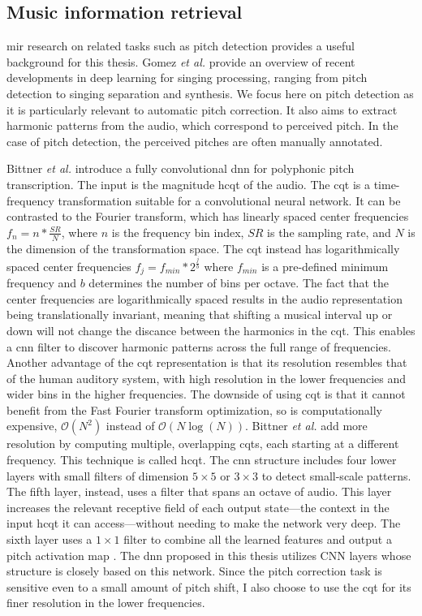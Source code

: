 \subsection{Music information retrieval}
\gls{mir} research on related tasks such as pitch detection provides a useful background for this thesis. Gomez {\it et al.}\cite{gomez2018deep} provide an overview of recent developments in deep learning for singing processing, ranging from pitch detection to singing separation and synthesis. We focus here on pitch detection as it is particularly relevant to automatic pitch correction. It also aims to extract harmonic patterns from the audio, which correspond to perceived pitch. In the case of pitch detection, the perceived pitches are often manually annotated. 

Bittner \textit{et al.} introduce a fully convolutional \gls{dnn} for polyphonic pitch transcription. The input is the magnitude \gls{hcqt} of the audio. The \gls{cqt} is a time-frequency transformation suitable for a convolutional neural network. It can be contrasted to the Fourier transform, which has linearly spaced center frequencies $f_n = n * \frac{SR}{N}$, where $n$ is the frequency bin index, $SR$ is the sampling rate, and $N$ is the dimension of the transformation space. The \gls{cqt} instead has logarithmically spaced center frequencies $f_j = f_{min} * 2^{\frac{j}{b}}$ where $f_{min}$ is a pre-defined minimum frequency and $b$ determines the number of bins per octave. The fact that the center frequencies are logarithmically spaced results in the audio representation being translationally invariant, meaning that shifting a musical interval up or down will not change the discance between the harmonics in the \gls{cqt}. This enables a \gls{cnn} filter to discover harmonic patterns across the full range of frequencies. Another advantage of the \gls{cqt} representation is that its resolution resembles that of the human auditory system, with high resolution in the lower frequencies and wider bins in the higher frequencies. The downside of using \gls{cqt} is that it cannot benefit from the Fast Fourier transform optimization, so is computationally expensive, $\mathcal{O}(N^2)$ instead of $\mathcal{O}(N \log (N))$. Bittner \textit{et al.} add more resolution by computing multiple, overlapping \gls{cqt}s, each starting at a different frequency. This technique is called \gls{hcqt}. The \gls{cnn} structure includes four lower layers with small filters of dimension $5 \times 5$ or $3 \times 3$ to detect small-scale patterns. The fifth layer, instead, uses a filter that spans an octave of audio. This layer increases the relevant receptive field of each output state---the context in the input \gls{hcqt} it can access---without needing to make the network very deep. The sixth layer uses a $1 \times 1$ filter to combine all the learned features and output a pitch activation map \cite{bittner2017deep}. The \gls{dnn} proposed in this thesis utilizes CNN layers whose structure is closely based on this network. Since the pitch correction task is sensitive even to a small amount of pitch shift, I also choose to use the \gls{cqt} for its finer resolution in the lower frequencies. 

